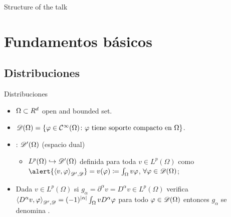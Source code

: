 
\begin{frame}[t,plain]
\titlepage
\end{frame}

\begin{frame}{Structure of the talk}
	\tableofcontents
\end{frame}

\section{Fundamentos básicos}

\subsection{Distribuciones}

\begin{frame}{Distribuciones}

\begin{itemize}\itemsep1em
	\item $\Omega\subset\relax R^d$ open and bounded set.
	\item $\mathscr{D}(\Omega)=\{\varphi\in\mathcal{C}^\infty(\Omega)\colon\varphi\text{ tiene soporte compacto en }\Omega\}$. 
	
	\item {}: $\mathscr{D}'(\Omega)$ (espacio dual)
	\begin{itemize}\itemsep1em
		\item $L^p(\Omega)\hookrightarrow\mathscr{D} '(\Omega)$ definida para toda $v\in L^p(\Omega)$ como $\alert{\dualD{v}{\varphi}}=v(\varphi)\coloneqq\int_\Omega v \varphi$, $\forall \varphi\in\mathscr{D}(\Omega)$;
	\end{itemize}

	\item Dada $v\in L^p(\Omega)$ si $g_\alpha=\partial^\alpha v=D^\alpha v\in L^p(\Omega)$ verifica ${\langle D^\alpha v, \varphi \rangle}_{\mathscr{D'},\mathscr{D}}=(-1)^{\left|\alpha\right|}\int_\Omega v D^\alpha \varphi$ para todo $\varphi\in\mathscr{D}(\Omega)$ entonces $g_\alpha$ se denomina .

\end{itemize}
\end{frame}

